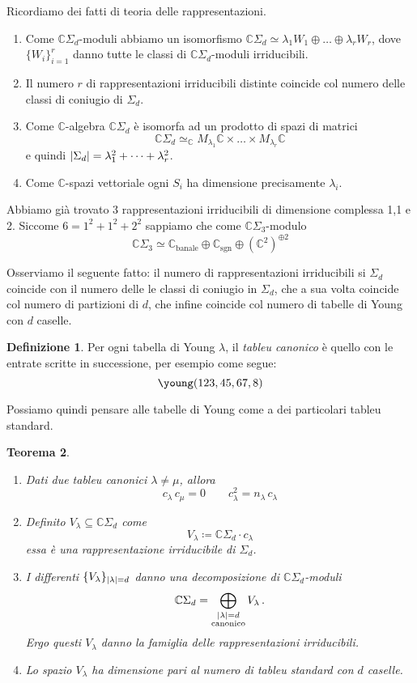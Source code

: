 \documentclass[a4paper, 11pt]{article}
\theoremstyle{definition}
\newtheorem{Def}{Definizione}[section]
\theoremstyle{plain}
\newtheorem{Teo}[Def]{Teorema}
\DeclarePairedDelimiter{\abs}{\lvert}{\rvert}
\newcommand{\C}{\mathbb{C}}
\newcommand{\deff}{\coloneqq}
\begin{document}
Ricordiamo dei fatti di teoria delle rappresentazioni.
\begin{enumerate}
	\item Come $\C \Sigma_d$-moduli abbiamo un isomorfismo $\C \Sigma_d \simeq \lambda_1 W_1 \oplus\dots\oplus \lambda_r W_r$, dove $\{W_i\}_{i=1}^r$ danno tutte le classi di $\C \Sigma_d$-moduli irriducibili.
	\item Il numero $r$ di rappresentazioni irriducibili distinte coincide col numero delle classi di coniugio di $\Sigma_d$.
	\item Come $\C$-algebra $\C \Sigma_d$ è isomorfa ad un prodotto di spazi di matrici 
	\[
		\C \Sigma_d \simeq_\C M_{\lambda_1}\C \times \dots \times M_{\lambda_r}\C
	\]
	e quindi $\abs{\Sigma_d} = \lambda_1^2+\dots+\lambda_r^2$. 
	\item Come $\C$-spazi vettoriale ogni $S_i$ ha dimensione precisamente $\lambda_i$.
\end{enumerate}

Abbiamo già trovato 3 rappresentazioni irriducibili di dimensione complessa 1,1 e 2. Siccome $6 = 1^2 + 1^2 + 2^2$ sappiamo che come $\C \Sigma_3$-modulo
\[
	\C \Sigma_3 \simeq \C_{\text{banale}} \oplus \C_{\text{sgn}}\oplus (\C^2)^{\oplus 2}
\]

Osserviamo il seguente fatto: il numero di rappresentazioni irriducibili si $\Sigma_d$ coincide con il numero delle le classi di coniugio in $\Sigma_d$, che a sua volta coincide col numero di partizioni di $d$, che infine coincide col numero di tabelle di Young con $d$ caselle. 

\begin{Def}
	Per ogni tabella di Young $\lambda$, il \emph{tableu canonico} è quello con le entrate scritte in successione, per esempio come segue:
	\[
		\young(123,45,67,8)
	\]
\end{Def}

Possiamo quindi pensare alle tabelle di Young come a dei particolari tableu standard. 
\begin{Teo}
	\begin{enumerate}
		\item Dati due tableu canonici $\lambda \neq \mu$, allora
		\[
			c_\lambda\,c_\mu = 0 \qquad c_\lambda^2 = n_\lambda\,c_\lambda
		\]
		\item Definito $V_\lambda \subseteq \C \Sigma_d$ come
		\[
			V_\lambda \deff \C \Sigma_d \cdot c_\lambda 
		\]
		essa è una rappresentazione irriducibile di $\Sigma_d$.
		\item I differenti $\{V_\lambda\}_{\abs{\lambda} = d}$ danno una decomposizione di $\C \Sigma_d$-moduli
		\[
			\C \Sigma_d = \bigoplus_{\substack{\abs{\lambda} = d\\ \text{canonico}}} V_\lambda\,.
		\]
		Ergo questi $V_\lambda$ danno la famiglia delle rappresentazioni irriducibili.
		\item Lo spazio $V_\lambda$ ha dimensione pari al numero di tableu standard con $d$ caselle.
	\end{enumerate}
\end{Teo}
\end{document}
